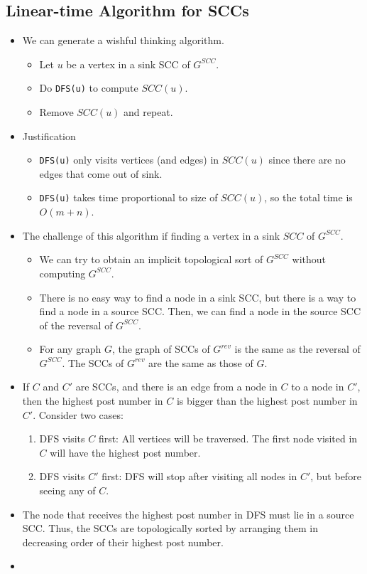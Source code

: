 \documentclass[12pt]{article}
\begin{document}
\subsection{Linear-time Algorithm for SCCs}
\begin{itemize}
    \item We can generate a wishful thinking algorithm.
    \begin{itemize}
        \item Let $u$ be a vertex in a sink SCC of $G^{SCC}$.
        \item Do \texttt{DFS(u)} to compute $SCC(u)$.
        \item Remove $SCC(u)$ and repeat.
    \end{itemize}
    \item Justification
    \begin{itemize}
        \item \texttt{DFS(u)} only visits vertices (and edges) in $SCC(u)$ since there are no edges that come out of sink.
        \item \texttt{DFS(u)} takes time proportional to size of $SCC(u)$, so the total time is $O(m + n)$.
    \end{itemize}
    \item The challenge of this algorithm if finding a vertex in a sink $SCC$ of $G^{SCC}$.
    \begin{itemize}
        \item We can try to obtain an implicit topological sort of $G^{SCC}$ without computing $G^{SCC}$.
        \item There is no easy way to find a node in a sink SCC, but there is a way to find a node in a source SCC. Then, we can find a node in the source SCC of the reversal of $G^{SCC}$.
        \item For any graph $G$, the graph of SCCs of $G^{rev}$ is the same as the reversal of $G^{SCC}$. The SCCs of $G^{rev}$ are the same as those of $G$.
    \end{itemize}
    \item If $C$ and $C'$ are SCCs, and there is an edge from a node in $C$ to a node in $C'$, then the highest post number in $C$ is bigger than the highest post number in $C'$. Consider two cases:
    \begin{enumerate}
        \item DFS visits $C$ first: All vertices will be traversed. The first node visited in $C$ will have the highest post number.
        \item DFS visits $C'$ first: DFS will stop after visiting all nodes in $C'$, but before seeing any of $C$.
    \end{enumerate}
    \item The node that receives the highest post number in DFS must lie in a source SCC. Thus, the SCCs are topologically sorted by arranging them in decreasing order of their highest post number. 
    \item[] 
\end{itemize}
\end{document}
